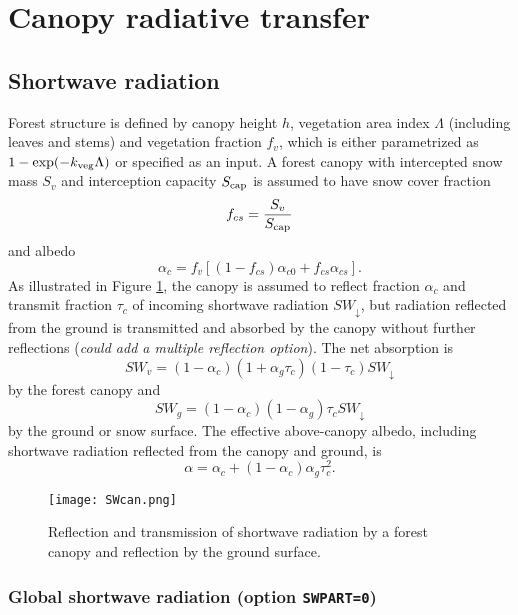 \documentclass{article}
\begin{document}
\section{Canopy radiative transfer}

\subsection{Shortwave radiation}

Forest structure is defined by canopy height $h$, vegetation area index $\Lambda$ (including leaves and stems) and vegetation fraction $f_v$, which is either parametrized as $1-\exp(-k_{\rm veg}\Lambda)$ or specified as an input. A forest canopy with intercepted snow mass $S_v$ and interception capacity $S_{\rm cap}$ is assumed to have snow cover fraction 
\begin{equation}
f_{cs} = \frac{S_v}{S_{\rm cap}}
\end{equation}
and albedo
\begin{equation}
\alpha_c = f_v[(1 - f_{cs})\alpha_{c0} + f_{cs}\alpha_{cs}].
\end{equation}
As illustrated in Figure \ref{fig:SWcan}, the canopy is assumed to reflect fraction $\alpha_c$ and transmit fraction $\tau_c$ of incoming shortwave radiation $SW_\downarrow$, but radiation reflected from the ground is transmitted and absorbed by the canopy without further reflections ({\it could add a multiple reflection option}). The net absorption is
\begin{equation}
SW_v = (1 - \alpha_c)(1 + \alpha_g\tau_c) (1 - \tau_c)SW_\downarrow
\label{eq:SWv} 
\end{equation} 
by the forest canopy and
\begin{equation}
SW_g = (1 - \alpha_c)(1 - \alpha_g)\tau_c SW_\downarrow
\label{eq:SWg} 
\end{equation} 
by the ground or snow surface. The effective above-canopy albedo, including shortwave radiation reflected from the canopy and ground, is
\begin{equation}
\alpha = \alpha_c + (1 - \alpha_c)\alpha_g\tau_c^2.
\end{equation} 

\begin{figure}[t]
\texttt{[image: SWcan.png]}
\caption{Reflection and transmission of shortwave radiation by a forest canopy and reflection by the ground surface.}
\label{fig:SWcan}
\end{figure}

\subsubsection{Global shortwave radiation (option {\tt SWPART=0})}
\end{document}
